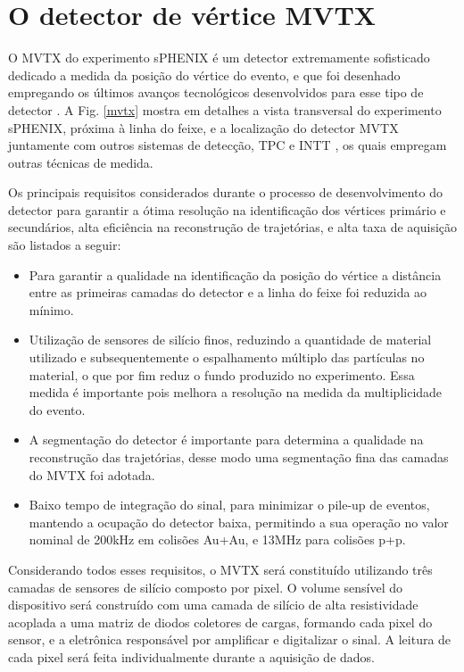 \chapter{O detector de vértice MVTX}

O MVTX do experimento sPHENIX é um detector extremamente sofisticado dedicado a medida da posição do vértice do evento, e que foi desenhado empregando os últimos avanços tecnológicos desenvolvidos para esse tipo de detector \cite{1}. A Fig. \ref{mvtx} mostra em detalhes a vista transversal do experimento sPHENIX, próxima à linha do feixe, e a localização do detector MVTX juntamente com outros sistemas de detecção, TPC e INTT \cite{1}, os quais empregam outras técnicas de medida.

Os principais requisitos considerados durante o processo de 
desenvolvimento do detector para garantir a ótima resolução na identificação dos vértices primário e secundários, alta eficiência na reconstrução de trajetórias, e alta taxa de aquisição são listados a seguir:

\begin{itemize}
 
\item Para garantir a qualidade na identificação da posição do vértice a distância entre as primeiras camadas do detector e a linha do feixe foi reduzida ao mínimo.

\item Utilização de sensores de silício finos, reduzindo a quantidade de material utilizado e subsequentemente o espalhamento múltiplo das partículas no material, o que por fim reduz o fundo produzido no experimento. Essa medida é importante pois melhora a resolução na medida da multiplicidade do evento.

\item A segmentação do detector é importante para determina a qualidade na reconstrução das trajetórias, desse modo uma segmentação fina das camadas do MVTX foi adotada.

\item Baixo tempo de integração do sinal, para minimizar o pile-up de eventos, mantendo a ocupação do detector baixa, permitindo a sua operação no valor nominal de 200kHz em colisões Au+Au, e 13MHz para colisões p+p. 

\end{itemize}

Considerando todos esses requisitos, o MVTX será constituído utilizando três camadas de sensores de silício composto por pixel. O volume sensível do dispositivo será construído com uma camada de silício de alta resistividade acoplada a uma matriz de diodos coletores de cargas, formando cada pixel do sensor, e a eletrônica responsável por amplificar e digitalizar o sinal. A leitura de cada pixel será feita individualmente durante a aquisição de dados.       

